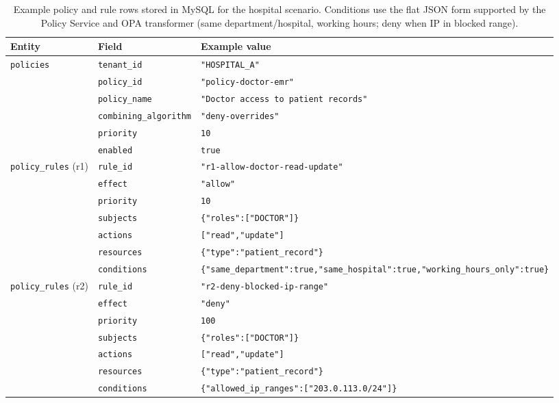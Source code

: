 \begin{table}[H]
\centering
\renewcommand{\arraystretch}{1.15}
\small
\begin{tabular}{|p{2.4cm}|p{3.8cm}|p{9.0cm}|}
\hline
\textbf{Entity} & \textbf{Field} & \textbf{Example value} \\
\hline
\texttt{policies} & \texttt{tenant\_id} & \texttt{"HOSPITAL\_A"} \\
\cline{2-3}
& \texttt{policy\_id} & \texttt{"policy-doctor-emr"} \\
\cline{2-3}
& \texttt{policy\_name} & \texttt{"Doctor access to patient records"} \\
\cline{2-3}
& \texttt{combining\_algorithm} & \texttt{"deny-overrides"} \\
\cline{2-3}
& \texttt{priority} & \texttt{10} \\
\cline{2-3}
& \texttt{enabled} & \texttt{true} \\
\hline

\texttt{policy\_rules} (r1) & \texttt{rule\_id} & \texttt{"r1-allow-doctor-read-update"} \\
\cline{2-3}
& \texttt{effect} & \texttt{"allow"} \\
\cline{2-3}
& \texttt{priority} & \texttt{10} \\
\cline{2-3}
& \texttt{subjects} & \texttt{\{"roles":["DOCTOR"]\}} \\
\cline{2-3}
& \texttt{actions} & \texttt{["read","update"]} \\
\cline{2-3}
& \texttt{resources} & \texttt{\{"type":"patient\_record"\}} \\
\cline{2-3}
& \texttt{conditions} &
\texttt{\{"same\_department":true,"same\_hospital":true,"working\_hours\_only":true\}} \\
\hline

\texttt{policy\_rules} (r2) & \texttt{rule\_id} & \texttt{"r2-deny-blocked-ip-range"} \\
\cline{2-3}
& \texttt{effect} & \texttt{"deny"} \\
\cline{2-3}
& \texttt{priority} & \texttt{100} \\
\cline{2-3}
& \texttt{subjects} & \texttt{\{"roles":["DOCTOR"]\}} \\
\cline{2-3}
& \texttt{actions} & \texttt{["read","update"]} \\
\cline{2-3}
& \texttt{resources} & \texttt{\{"type":"patient\_record"\}} \\
\cline{2-3}
& \texttt{conditions} & \texttt{\{"allowed\_ip\_ranges":["203.0.113.0/24"]\}} \\
\hline
\end{tabular}
\caption{Example policy and rule rows stored in MySQL for the hospital scenario. Conditions use the flat JSON form supported by the Policy Service and OPA transformer (same department/hospital, working hours; deny when IP in blocked range).}
\label{tab:policy-service-examples}
\end{table}

